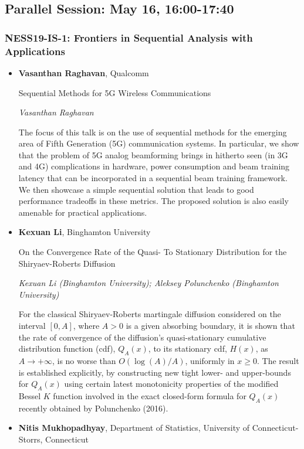 \subsection*{Parallel Session: May 16, 16:00-17:40}

\subsubsection*{NESS19-IS-1: Frontiers in Sequential Analysis with Applications}

\begin{itemize}
\item \textbf{Vasanthan Raghavan}, Qualcomm

Sequential Methods for 5G Wireless Communications

\emph{\footnotesize Vasanthan Raghavan}

The focus of this talk is on the use of sequential methods for the emerging area of Fifth Generation (5G) communication systems. In particular, we show that the problem of 5G analog beamforming brings in hitherto seen (in 3G and 4G) complications in hardware, power consumption and beam training latency that can be incorporated in a sequential beam training framework. We then showcase a simple sequential solution that leads to good performance tradeoffs in these metrics. The proposed solution is also easily amenable for practical applications.

\item \textbf{Kexuan Li}, Binghamton University

On the Convergence Rate of the Quasi- To Stationary Distribution for the Shiryaev-Roberts Diffusion

\emph{\footnotesize Kexuan Li (Binghamton University); Aleksey Polunchenko (Binghamton University)}

For the classical Shiryaev-Roberts martingale diffusion considered on the interval $[0,A]$, where $A>0$ is a given absorbing boundary, it is shown that the rate of convergence of the diffusion's quasi-stationary cumulative distribution function (cdf), $Q_{A}(x)$, to its stationary cdf, $H(x)$, as $A\to+\infty$, is no worse than $O(\log(A)/A)$, uniformly in $x\ge0$. The result is established explicitly, by constructing new tight lower- and upper-bounds for $Q_{A}(x)$ using certain latest monotonicity properties of the modified Bessel $K$ function involved in the exact closed-form formula for $Q_{A}(x)$ recently obtained by Polunchenko (2016).

\item \textbf{Nitis Mukhopadhyay}, Department of Statistics, University of Connecticut-Storrs, Connecticut


\end{itemize}
